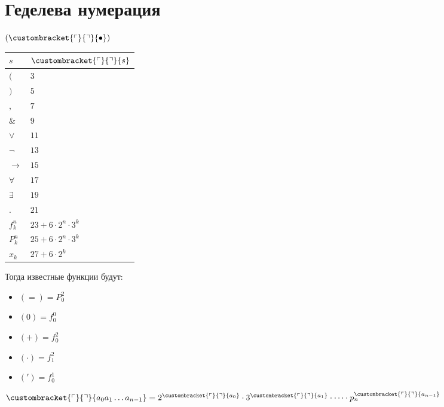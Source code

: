 \documentclass[oneside]{book}
\newcommand{\gedel}[1]{\custombracket{\ulcorner}{\urcorner}{#1}}
\newcommand{\gedel}[1]{\custombracket{\ulcorner}{\urcorner}{#1}}
\newcommand{\gedel}[1]{\custombracket{\ulcorner}{\urcorner}{#1}}
\newcommand{\gedel}[1]{\custombracket{\ulcorner}{\urcorner}{#1}}
\begin{document}
\section{Геделева нумерация}
\label{sec:org3ae950e}
\begin{definition}
	\((\gedel{\bullet})\)
	\begin{center}
		\begin{tabular}{l|l}
			\(s\)       & \(\gedel{s}\)                 \\
			\hline
			\((\)       & \(3\)                         \\
			\hline
			\()\)       & \(5\)                         \\
			\hline
			\(,\)       & \(7\)                         \\
			\hline
			\(\&\)      & \(9\)                         \\
			\hline
			\(\vee\)    & \(11\)                        \\
			\hline
			\(\neg\)    & \(13\)                        \\
			\hline
			\(\to\)     & \(15\)                        \\
			\hline
			\(\forall\) & \(17\)                        \\
			\hline
			\(\exists\) & \(19\)                        \\
			\hline
			\(.\)       & \(21\)                        \\
			\hline
			\(f^n_k\)   & \(23 + 6\cdot 2^n \cdot 3^k\) \\
			\hline
			\(P^n_k\)   & \(25 + 6\cdot 2^n\cdot 3^k\)  \\
			\hline
			\(x_k\)     & \(27 + 6\cdot 2^k\)           \\
		\end{tabular}
	\end{center}
	Тогда известные функции будут:
	\begin{itemize}
		\item \((=) = P^2_0\)
		\item \((0) = f^0_0\)
		\item \((+) = f^2_0\)
		\item \((\cdot) = f^2_1\)
		\item \((') = f^1_0\)
	\end{itemize}
	\label{orgb9c4eac}
\end{definition}
\begin{definition}
	\(\gedel{a_0a_1\dots a_{n - 1}} = 2^{\gedel{a_0}}\cdot 3^{\gedel{a_1}} \cdot \dots \cdot p_n^{\gedel{a_{n - 1}}}\)
	\label{org90ddeb2}
\end{definition}
\end{document}

